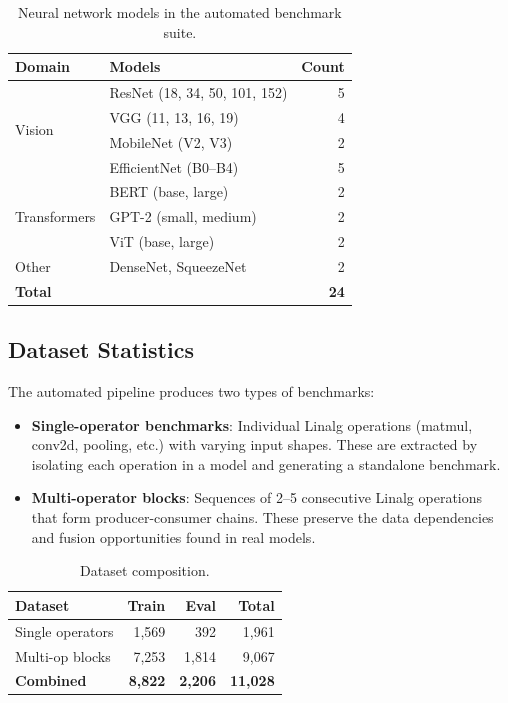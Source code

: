 \documentclass[10pt,twocolumn]{article}
\begin{document}
\begin{table}[t]
\centering
\caption{Neural network models in the automated benchmark suite.}
\label{tab:newmodels}
\begin{tabular}{llr}
\toprule
Domain & Models & Count \\
\midrule
\multirow{4}{*}{Vision} & ResNet (18, 34, 50, 101, 152) & 5 \\
 & VGG (11, 13, 16, 19) & 4 \\
 & MobileNet (V2, V3) & 2 \\
 & EfficientNet (B0--B4) & 5 \\
\midrule
\multirow{3}{*}{Transformers} & BERT (base, large) & 2 \\
 & GPT-2 (small, medium) & 2 \\
 & ViT (base, large) & 2 \\
\midrule
Other & DenseNet, SqueezeNet & 2 \\
\midrule
\multicolumn{2}{l}{\textbf{Total}} & \textbf{24} \\
\bottomrule
\end{tabular}
\end{table}

\subsection{Dataset Statistics}

The automated pipeline produces two types of benchmarks:

\begin{itemize}
\item \textbf{Single-operator benchmarks}: Individual Linalg operations (matmul, conv2d, pooling, etc.) with varying input shapes. These are extracted by isolating each operation in a model and generating a standalone benchmark.

\item \textbf{Multi-operator blocks}: Sequences of 2--5 consecutive Linalg operations that form producer-consumer chains. These preserve the data dependencies and fusion opportunities found in real models.
\end{itemize}

\begin{table}[t]
\centering
\caption{Dataset composition.}
\label{tab:dataset}
\begin{tabular}{lrrr}
\toprule
Dataset & Train & Eval & Total \\
\midrule
Single operators & 1,569 & 392 & 1,961 \\
Multi-op blocks & 7,253 & 1,814 & 9,067 \\
\midrule
\textbf{Combined} & \textbf{8,822} & \textbf{2,206} & \textbf{11,028} \\
\bottomrule
\end{tabular}
\end{table}
\end{document}
